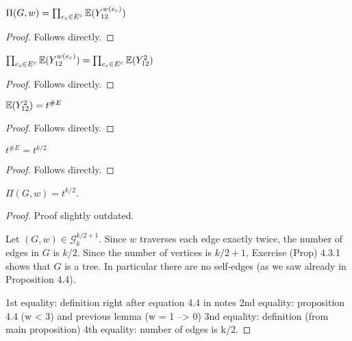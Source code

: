 \begin{lemma}
  \label{lemma:prod_expansion}
  \notready
  $\Pi(G,w) = \prod_{e_c\in E^c} \mathbb{E}(Y_{12}^{w(e_c)})$
\end{lemma}

\begin{proof}
  \notready
  Follows directly.
\end{proof}

\begin{lemma}
  \label{lemma:w_2_case}
  \notready
  $\prod_{e_c\in E^c} \mathbb{E}(Y_{12}^{w(e_c)}) = \prod_{e_c\in E^c} \mathbb{E}(Y_{12}^2)$
\end{lemma}

\begin{proof}
  \notready
  Follows directly.
\end{proof}

\begin{lemma}
  \label{lemma:def_t_rewrite}
  \notready
  $\mathbb{E}(Y_{12}^2) = t^{\#E}$
\end{lemma}

\begin{proof}
  \notready
  Follows directly.
\end{proof}

\begin{lemma}
  \label{lemma:e_equals_k_over_two}
  \notready
  $t^{\#E} = t^{k/2}$
\end{lemma}

\begin{proof}
  \notready
  Follows directly.
\end{proof}



\begin{proposition}%
  \label{prop:product_g_w_to_exponential}
  \notready
  $\Pi(G,w) = t^{k/2}$.
\end{proposition}

\begin{proof}
  \notready
  Proof slightly outdated.

  Let $(G,w)\in\mathcal{G}^{k/2+1}_k$.  Since $w$ traverses each edge exactly twice, the number of edges in $G$ is $k/2$.  Since the number of vertices is $k/2+1$, Exercise (Prop) 4.3.1 shows that $G$ is a tree.  In particular there are no self-edges (as we saw already in Proposition 4.4).

  1st equality: definition right after equation 4.4 in notes
  2nd equality: proposition 4.4 (w < 3) and previous lemma (w = 1 --> 0)
  3nd equality: definition (from main proposition)
  4th equality: number of edges is k/2.
\end{proof}




